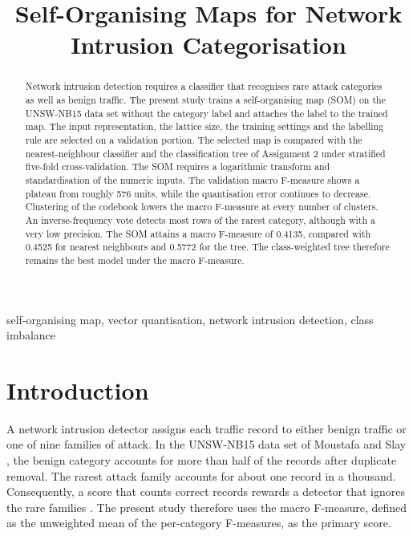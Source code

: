 \documentclass[conference,10pt]{IEEEtran}
\title{Self-Organising Maps for Network Intrusion Categorisation}
\author{\IEEEauthorblockN{26946777}
\IEEEauthorblockA{RW 741 Machine Learning\\
Department of Computer Science, Stellenbosch University}}
\begin{document}
\maketitle

\begin{abstract}
Network intrusion detection requires a classifier that recognises rare attack categories as well as benign traffic.
The present study trains a self-organising map (SOM) on the UNSW-NB15 data set without the category label and attaches the label to the trained map.
The input representation, the lattice size, the training settings and the labelling rule are selected on a validation portion.
The selected map is compared with the nearest-neighbour classifier and the classification tree of Assignment 2 under stratified five-fold cross-validation.
The SOM requires a logarithmic transform and standardisation of the numeric inputs.
The validation macro F-measure shows a plateau from roughly 576 units, while the quantisation error continues to decrease.
Clustering of the codebook lowers the macro F-measure at every number of clusters.
An inverse-frequency vote detects most rows of the rarest category, although with a very low precision.
The SOM attains a macro F-measure of 0.4135, compared with 0.4525 for nearest neighbours and 0.5772 for the tree.
The class-weighted tree therefore remains the best model under the macro F-measure.
\end{abstract}

\let\thefootnote\relax
{}

\begin{IEEEkeywords}
self-organising map, vector quantisation, network intrusion detection, class imbalance
\end{IEEEkeywords}

\section{Introduction}
A network intrusion detector assigns each traffic record to either benign traffic or one of nine families of attack.
In the UNSW-NB15 data set of Moustafa and Slay \cite{moustafa2015}, the benign category accounts for more than half of the records after duplicate removal.
The rarest attack family accounts for about one record in a thousand.
Consequently, a score that counts correct records rewards a detector that ignores the rare families \cite{he2009}.
The present study therefore uses the macro F-measure, defined as the unweighted mean of the per-category F-measures, as the primary score.
\end{document}
